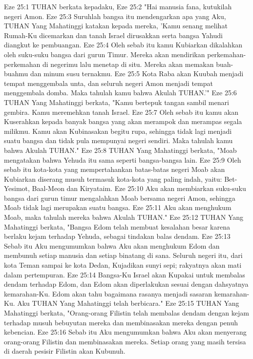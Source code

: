 Eze 25:1  TUHAN berkata kepadaku,
Eze 25:2  "Hai manusia fana, kutukilah negeri Amon.
Eze 25:3  Suruhlah bangsa itu mendengarkan apa yang Aku, TUHAN Yang Mahatinggi katakan kepada mereka, 'Kamu senang melihat Rumah-Ku dicemarkan dan tanah Israel dirusakkan serta bangsa Yahudi diangkut ke pembuangan.
Eze 25:4  Oleh sebab itu kamu Kubiarkan dikalahkan oleh suku-suku bangsa dari gurun Timur. Mereka akan mendirikan perkemahan-perkemahan di negerimu lalu menetap di situ. Mereka akan memakan buah-buahmu dan minum susu ternakmu.
Eze 25:5  Kota Raba akan Kuubah menjadi tempat menggembala unta, dan seluruh negeri Amon menjadi tempat menggembala domba. Maka tahulah kamu bahwa Akulah TUHAN.'"
Eze 25:6  TUHAN Yang Mahatinggi berkata, "Kamu bertepuk tangan sambil menari gembira. Kamu meremehkan tanah Israel.
Eze 25:7  Oleh sebab itu kamu akan Kuserahkan kepada banyak bangsa yang akan merampok dan merampas segala milikmu. Kamu akan Kubinasakan begitu rupa, sehingga tidak lagi menjadi suatu bangsa dan tidak pula mempunyai negeri sendiri. Maka tahulah kamu bahwa Akulah TUHAN."
Eze 25:8  TUHAN Yang Mahatinggi berkata, "Moab mengatakan bahwa Yehuda itu sama seperti bangsa-bangsa lain.
Eze 25:9  Oleh sebab itu kota-kota yang mempertahankan batas-batas negeri Moab akan Kubiarkan diserang musuh termasuk kota-kota yang paling indah, yaitu: Bet-Yesimot, Baal-Meon dan Kiryataim.
Eze 25:10  Aku akan membiarkan suku-suku bangsa dari gurun timur mengalahkan Moab bersama negeri Amon, sehingga Moab tidak lagi merupakan suatu bangsa.
Eze 25:11  Aku akan menghukum Moab, maka tahulah mereka bahwa Akulah TUHAN."
Eze 25:12  TUHAN Yang Mahatinggi berkata, "Bangsa Edom telah membuat kesalahan besar karena berlaku kejam terhadap Yehuda, sebagai tindakan balas dendam.
Eze 25:13  Sebab itu Aku mengumumkan bahwa Aku akan menghukum Edom dan membunuh setiap manusia dan setiap binatang di sana. Seluruh negeri itu, dari kota Teman sampai ke kota Dedan, Kujadikan sunyi sepi; rakyatnya akan mati dalam pertempuran.
Eze 25:14  Bangsa-Ku Israel akan Kupakai untuk membalas dendam terhadap Edom, dan Edom akan diperlakukan sesuai dengan dahsyatnya kemarahan-Ku. Edom akan tahu bagaimana rasanya menjadi sasaran kemarahan-Ku. Aku TUHAN Yang Mahatinggi telah berbicara."
Eze 25:15  TUHAN Yang Mahatinggi berkata, "Orang-orang Filistin telah membalas dendam dengan kejam terhadap musuh bebuyutan mereka dan membinasakan mereka dengan penuh kebencian.
Eze 25:16  Sebab itu Aku mengumumkan bahwa Aku akan menyerang orang-orang Filistin dan membinasakan mereka. Setiap orang yang masih tersisa di daerah pesisir Filistin akan Kubunuh.
